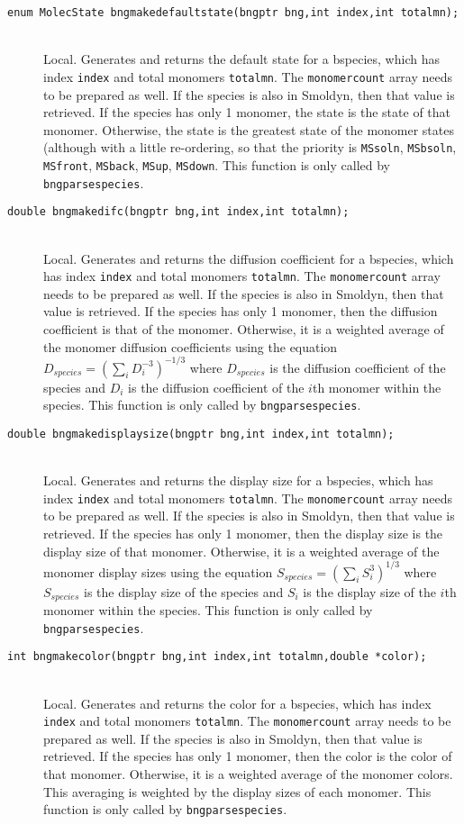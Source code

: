 \documentclass {book}
\newcommand {\ttt} {\texttt}
\begin{document}
\begin{description}
\item[\ttt{enum MolecState bngmakedefaultstate(bngptr bng,int index,int totalmn);}]
\hfill \\
Local. Generates and returns the default state for a bspecies, which has index \ttt{index} and total monomers \ttt{totalmn}. The \ttt{monomercount} array needs to be prepared as well. If the species is also in Smoldyn, then that value is retrieved. If the species has only 1 monomer, the state is the state of that monomer. Otherwise, the state is the greatest state of the monomer states (although with a little re-ordering, so that the priority is \ttt{MSsoln}, \ttt{MSbsoln}, \ttt{MSfront}, \ttt{MSback}, \ttt{MSup}, \ttt{MSdown}. This function is only called by \ttt{bngparsespecies}.

\item[\ttt{double bngmakedifc(bngptr bng,int index,int totalmn);}]
\hfill \\
Local. Generates and returns the diffusion coefficient for a bspecies, which has index \ttt{index} and total monomers \ttt{totalmn}. The \ttt{monomercount} array needs to be prepared as well. If the species is also in Smoldyn, then that value is retrieved. If the species has only 1 monomer, then the diffusion coefficient is that of the monomer. Otherwise, it is a weighted average of the monomer diffusion coefficients using the equation
$D_{species} = (\sum_{i} D_i^{-3})^{-1/3}$
where $D_{species}$ is the diffusion coefficient of the species and $D_i$ is the diffusion coefficient of the $i$th monomer within the species. This function is only called by \ttt{bngparsespecies}.

\item[\ttt{double bngmakedisplaysize(bngptr bng,int index,int totalmn);}]
\hfill \\
Local. Generates and returns the display size for a bspecies, which has index \ttt{index} and total monomers \ttt{totalmn}. The \ttt{monomercount} array needs to be prepared as well. If the species is also in Smoldyn, then that value is retrieved. If the species has only 1 monomer, then the display size is the display size of that monomer. Otherwise, it is a weighted average of the monomer display sizes using the equation
$S_{species} = (\sum_{i} S_i^{3})^{1/3}$
where $S_{species}$ is the display size of the species and $S_i$ is the display size of the $i$th monomer within the species. This function is only called by \ttt{bngparsespecies}.

\item[\ttt{int bngmakecolor(bngptr bng,int index,int totalmn,double *color);}]
\hfill \\
Local. Generates and returns the color for a bspecies, which has index \ttt{index} and total monomers \ttt{totalmn}. The \ttt{monomercount} array needs to be prepared as well. If the species is also in Smoldyn, then that value is retrieved. If the species has only 1 monomer, then the color is the color of that monomer. Otherwise, it is a weighted average of the monomer colors. This averaging is weighted by the display sizes of each monomer. This function is only called by \ttt{bngparsespecies}.


\end{description}
\end{document}
